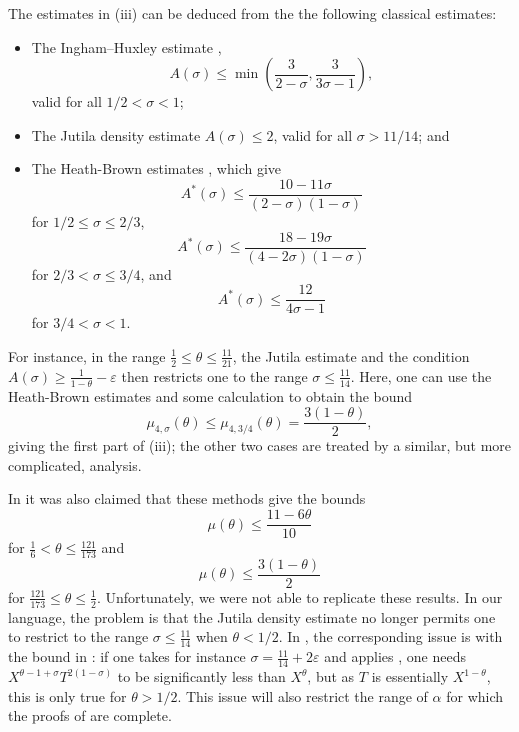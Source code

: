 \documentclass[12pt]{amsart}
\newcommand{\eps}{\varepsilon}
\begin{document}
The estimates in (iii) can be deduced from the the following classical estimates:
\begin{itemize}
  \item The Ingham--Huxley estimate \cite{ingham}, \cite{huxley}
$$ A(\sigma) \leq \min\left( \frac{3}{2-\sigma}, \frac{3}{3\sigma-1}\right),$$
valid for all $1/2 < \sigma < 1$;
\item The Jutila density estimate \cite{jutila} $A(\sigma) \leq 2$, valid for all $\sigma > 11/14$; and
\item The Heath-Brown estimates \cite{HB-2}, which give
$$A^*(\sigma) \leq \frac{10-11\sigma}{(2-\sigma)(1-\sigma)}$$
for $1/2 \leq \sigma \leq 2/3$,
$$A^*(\sigma) \leq \frac{18-19\sigma}{(4-2\sigma)(1-\sigma)}$$
for $2/3 < \sigma \leq 3/4$, and
$$A^*(\sigma) \leq \frac{12}{4\sigma-1}$$
for $3/4 < \sigma < 1$.
\end{itemize}

For instance, in the range $\frac{1}{2} \leq \theta \leq \frac{11}{21}$, the Jutila estimate and the condition $A(\sigma) \geq \frac{1}{1-\theta}-\eps$ then restricts one to the range $\sigma \leq \frac{11}{14}$.  Here, one can use the Heath-Brown estimates and some calculation to obtain the bound
$$ \mu_{4,\sigma}(\theta) \leq \mu_{4,3/4}(\theta) = \frac{3(1-\theta)}{2},$$
giving the first part of (iii); the other two cases are treated by a similar, but more complicated, analysis.

In \cite{baz-2} it was also claimed that these methods give the bounds
$$ \mu(\theta) \leq \frac{11-6\theta}{10}$$
for $\frac{1}{6} < \theta \leq \frac{121}{173}$ and
$$ \mu(\theta) \leq \frac{3(1-\theta)}{2}$$
for $\frac{121}{173} \leq \theta \leq \frac{1}{2}$.  Unfortunately, we were not able to replicate these results.  In our language, the problem is that the Jutila density estimate no longer permits one to restrict to the range $\sigma \leq \frac{11}{14}$ when $\theta < 1/2$.  In \cite{baz-2}, the corresponding issue is with  the bound in \cite[(13)]{baz-2}: if one takes for instance $\sigma = \frac{11}{14}+2\eps$ and applies \cite[(12)]{baz-2}, one needs $X^{\theta-1+\sigma} T^{2(1-\sigma)}$ to be significantly less than $X^\theta$, but as $T$ is essentially $X^{1-\theta}$, this is only true for $\theta > 1/2$.  This issue will also restrict the range of $\alpha$ for which the proofs of \cite[Theorems 1,2]{baz-2} are complete.
\end{document}
